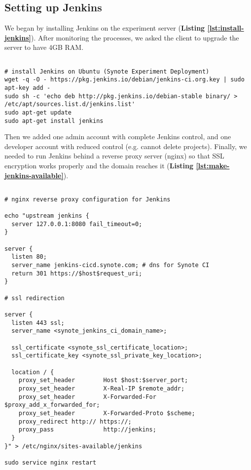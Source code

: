 \subsection{Setting up Jenkins}
\label{subsec:setting-up-jenkins}

We began by installing Jenkins on the experiment server (\textbf{Listing \ref{lst:install-jenkins}}). After monitoring the processes, we asked the client to upgrade the server to have 4GB RAM.

\begin{listing}[H]
\begin{verbatim}

# install Jenkins on Ubuntu (Synote Experiment Deployment)
wget -q -O - https://pkg.jenkins.io/debian/jenkins-ci.org.key | sudo apt-key add -
sudo sh -c 'echo deb http://pkg.jenkins.io/debian-stable binary/ > /etc/apt/sources.list.d/jenkins.list'
sudo apt-get update
sudo apt-get install jenkins

\end{verbatim}
\label{lst:install-jenkins}
\end{listing}

Then we added one admin account with complete Jenkins control, and one developer account with reduced control (e.g. cannot delete projects). Finally, we needed to run Jenkins behind a reverse proxy server (nginx) so that SSL encryption works properly and the domain reaches it (\textbf{Listing \ref{lst:make-jenkins-available}}).

\begin{listing}[H]
\begin{verbatim}

# nginx reverse proxy configuration for Jenkins

echo "upstream jenkins {
  server 127.0.0.1:8080 fail_timeout=0;
}

server {
  listen 80;
  server_name jenkins-cicd.synote.com; # dns for Synote CI
  return 301 https://$host$request_uri;
}

# ssl redirection

server {
  listen 443 ssl;
  server_name <synote_jenkins_ci_domain_name>;

  ssl_certificate <synote_ssl_certificate_location>;
  ssl_certificate_key <synote_ssl_private_key_location>;

  location / {
    proxy_set_header        Host $host:$server_port;
    proxy_set_header        X-Real-IP $remote_addr;
    proxy_set_header        X-Forwarded-For $proxy_add_x_forwarded_for;
    proxy_set_header        X-Forwarded-Proto $scheme;
    proxy_redirect http:// https://;
    proxy_pass              http://jenkins;
  }
}" > /etc/nginx/sites-available/jenkins

sudo service nginx restart

\end{verbatim}
\label{lst:make-jenkins-available}
\end{listing}

